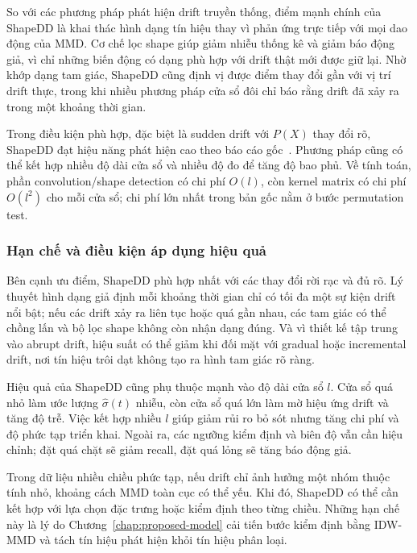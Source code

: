 So với các phương pháp phát hiện drift truyền thống, điểm mạnh chính của ShapeDD là khai thác hình dạng tín hiệu thay vì phản ứng trực tiếp với mọi dao động của MMD. Cơ chế lọc shape giúp giảm nhiễu thống kê và giảm báo động giả, vì chỉ những biến động có dạng phù hợp với drift thật mới được giữ lại. Nhờ khớp dạng tam giác, ShapeDD cũng định vị được điểm thay đổi gần với vị trí drift thực, trong khi nhiều phương pháp cửa sổ đôi chỉ báo rằng drift đã xảy ra trong một khoảng thời gian.

Trong điều kiện phù hợp, đặc biệt là sudden drift với $P(X)$ thay đổi rõ, ShapeDD đạt hiệu năng phát hiện cao theo báo cáo gốc~\cite{shapeDD2021}. Phương pháp cũng có thể kết hợp nhiều độ dài cửa sổ và nhiều độ đo để tăng độ bao phủ. Về tính toán, phần convolution/shape detection có chi phí $O(l)$, còn kernel matrix có chi phí $O(l^2)$ cho mỗi cửa sổ; chi phí lớn nhất trong bản gốc nằm ở bước permutation test.

\subsubsection{Hạn chế và điều kiện áp dụng hiệu quả}
Bên cạnh ưu điểm, ShapeDD phù hợp nhất với các thay đổi rời rạc và đủ rõ. Lý thuyết hình dạng giả định mỗi khoảng thời gian chỉ có tối đa một sự kiện drift nổi bật; nếu các drift xảy ra liên tục hoặc quá gần nhau, các tam giác có thể chồng lấn và bộ lọc shape không còn nhận dạng đúng. Và vì thiết kế tập trung vào abrupt drift, hiệu suất có thể giảm khi đối mặt với gradual hoặc incremental drift, nơi tín hiệu trôi dạt không tạo ra hình tam giác rõ ràng.

Hiệu quả của ShapeDD cũng phụ thuộc mạnh vào độ dài cửa sổ $l$. Cửa sổ quá nhỏ làm ước lượng $\hat{\sigma}(t)$ nhiễu, còn cửa sổ quá lớn làm mờ hiệu ứng drift và tăng độ trễ. Việc kết hợp nhiều $l$ giúp giảm rủi ro bỏ sót nhưng tăng chi phí và độ phức tạp triển khai. Ngoài ra, các ngưỡng kiểm định và biên độ vẫn cần hiệu chỉnh; đặt quá chặt sẽ giảm recall, đặt quá lỏng sẽ tăng báo động giả.

Trong dữ liệu nhiều chiều phức tạp, nếu drift chỉ ảnh hưởng một nhóm thuộc tính nhỏ, khoảng cách MMD toàn cục có thể yếu. Khi đó, ShapeDD có thể cần kết hợp với lựa chọn đặc trưng hoặc kiểm định theo từng chiều. Những hạn chế này là lý do Chương~\ref{chap:proposed-model} cải tiến bước kiểm định bằng IDW-MMD và tách tín hiệu phát hiện khỏi tín hiệu phân loại.
